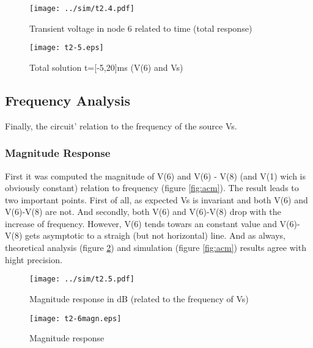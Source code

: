 \begin{figure}[h] \centering
  \begin{minipage}{.5\textwidth}
    \texttt{[image: ../sim/t2.4.pdf]}
    \caption{Transient voltage in node 6 related to time (total response)}
    \label{fig:trans2}
    \end{minipage}%
  \begin{minipage}{.5\textwidth}
    \vspace{10mm}
  \centering
    \texttt{[image: t2-5.eps]}
    \caption{Total solution t=[-5,20]ms (V(6) and Vs)}
    \label{fig:comptot}
      \end{minipage}%
\end{figure}




\subsection{Frequency Analysis}

Finally, the circuit' relation to the frequency of the source Vs.

\subsubsection{Magnitude Response}

First it was computed the magnitude of V(6) and V(6) - V(8) (and V(1) wich is obviously constant) relation to frequency (figure \ref{fig:acm}). The result leads to two important points. First of all, as expected Vs is invariant and both V(6) and V(6)-V(8) are not. And secondly, both V(6) and V(6)-V(8) drop with the increase of frequency. However, V(6) tends towars an constant value and V(6)-V(8) gets asymptotic to a straigh (but not horizontal) line. And as always, theoretical analysis (figure \ref{fig:compmagn}) and simulation (figure \ref{fig:acm}) results agree with hight precision.



\begin{figure}[h] \centering
  \begin{minipage}{.5\textwidth}
    \texttt{[image: ../sim/t2.5.pdf]}
    \caption{Magnitude response in dB (related to the frequency of Vs)}
    \label{fig:acm}
    \end{minipage}%
  \begin{minipage}{.5\textwidth}
    \vspace{10mm}
  \centering
    \texttt{[image: t2-6magn.eps]}
    \caption{Magnitude response}
    \label{fig:compmagn}
      \end{minipage}%
\end{figure}

